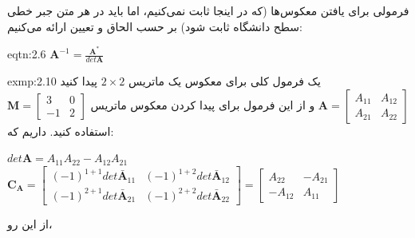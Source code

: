 {\begin{spacing}{1.5}
        فرمولی برای یافتن معکوس‌ها (که در اینجا ثابت نمی‌کنیم، اما باید در هر متن جبر خطی سطح دانشگاه ثابت شود) بر حسب الحاق و تعیین ارائه می‌کنیم:

        \begin{eqtn}{eqtn:2.6}
            \centering
            $\textbf{A}^{-1}=\frac{\displaystyle\textbf{A}^{*}}{\displaystyle det\textbf{A}}$
        \end{eqtn}

        \begin{exmp}{exmp:2.10}
            \Large
            یک فرمول کلی برای معکوس یک ماتریس $2\times 2$ پیدا کنید $\textbf{A}=\begin{bmatrix}
                                                                                    A_{11} & A_{12} \\
                                                                                    A_{21} & A_{22}
            \end{bmatrix}$ و از این فرمول برای پیدا کردن معکوس ماتریس $\textbf{M}=\begin{bmatrix}
                                                                                      3  & 0 \\
                                                                                      -1 & 2
            \end{bmatrix}$ استفاده کنید.
            داریم که:

            \begin{center}
                $det \textbf{A}=A_{11}A_{22}-A_{12}A_{21}$ \textbf{\vspace{6pt}}
                $\textbf{C}_{\textbf{A}}=\begin{bmatrix}
                (-1)
                                             ^{1+1}det\bar{\textbf{A}}_{11}     & (-1)^{1+2}det\bar{\textbf{A}}_{12} \\
                                             (-1)^{2+1}det\bar{\textbf{A}}_{21} & (-1)^{2+2}det\bar{\textbf{A}}_{22}
                \end{bmatrix}=\begin{bmatrix}
                                  A_{22}  & -A_{21} \\
                                  -A_{12} & A_{11}
                \end{bmatrix}$
            \end{center}

            از این رو،


\end{exmp}
\end{spacing}}
